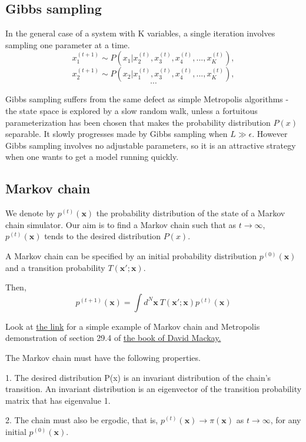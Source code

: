 \documentclass[a4paper,11pt]{article}
\newcommand{\vect}[1]{\boldsymbol{\mathbf{#1}}}
\numberwithin{equation}{section}
\begin{document}
{\subsection{Gibbs sampling}

In the general case of a system with K variables, a single iteration involves
sampling one parameter at a time. 
$$
x^{(t+1)}_1 \sim P(x_1|x^{(t)}_2,x^{(t)}_3,x^{(t)}_4,...,x^{(t)}_K),
$$
$$
x^{(t+1)}_2 \sim P(x_2|x^{(t)}_1,x^{(t)}_3,x^{(t)}_4,...,x^{(t)}_K),
$$
$$
\cdots
$$

Gibbs sampling suffers from the same defect as simple Metropolis algorithms - the state space is explored by a slow random walk, unless a fortuitous parameterization
has been chosen that makes the probability distribution $P(x)$
separable. It slowly progresses made by
Gibbs sampling when $ L \gg \epsilon$. However Gibbs sampling involves no adjustable parameters, so it is an attractive
strategy when one wants to get a model running quickly.

\subsection{Markov chain}

We denote by $p^{(t)}(\vect x)$ the probability
distribution of the state of a Markov chain simulator. Our aim is to find a Markov chain such that as $t \rightarrow \infty$, $p^{(t)}(\vect x)$ tends
to the desired distribution $P(x)$.

A Markov chain can be specified by an initial probability distribution $p^{(0)}(\vect x)$ and a transition probability $T(\vect x' ; \vect x)$.

Then, 
$$
p^{(t+1)}(\vect x) = \int d^N \vect x ~T(\vect x' ; \vect x)p^{(t)}(\vect x)
$$

Look at \href{https://github.com/physhik/Study-of-David-Mackay-s-book-/blob/master/reproduceFigure29.14.pdf/}{the link} for a simple example of Markov chain and Metropolis demonstration of section 29.4 of \href{http://www.inference.phy.cam.ac.uk/mackay/itila/}{the book of David Mackay.}

The Markov chain must have the following properties. 

1. The desired distribution P(x) is an invariant distribution of the chain's transition. An invariant distribution is an eigenvector of the transition probability matrix that has eigenvalue 1.

2. The chain must also be ergodic, that is, $p^{(t)}(\vect x) \rightarrow \pi(\vect x)$ as $t \rightarrow \infty$, for any initial $p^{(0)}(\vect x)$. 

}
\end{document}
